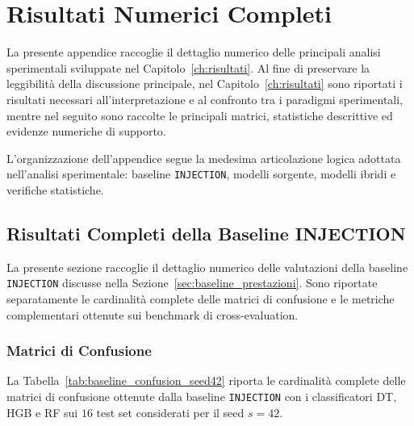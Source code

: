 \chapter{Risultati Numerici Completi}
\label{app:risultati_completi}

La presente appendice raccoglie il dettaglio numerico delle principali analisi sperimentali sviluppate nel Capitolo~\ref{ch:risultati}.
Al fine di preservare la leggibilità della discussione principale, nel Capitolo~\ref{ch:risultati} sono riportati i risultati necessari all'interpretazione e al confronto tra i paradigmi sperimentali, mentre nel seguito sono raccolte le principali matrici, statistiche descrittive ed evidenze numeriche di supporto.

L'organizzazione dell'appendice segue la medesima articolazione logica adottata nell'analisi sperimentale: baseline \texttt{INJECTION}, modelli sorgente, modelli ibridi e verifiche statistiche.



\section{Risultati Completi della Baseline INJECTION}
\label{app:baseline_injection}

La presente sezione raccoglie il dettaglio numerico delle valutazioni della baseline \texttt{INJECTION} discusse nella Sezione~\ref{sec:baseline_prestazioni}. 
Sono riportate separatamente le cardinalità complete delle matrici di confusione e le metriche complementari ottenute sui benchmark di cross-evaluation.

\subsection{Matrici di Confusione}

La Tabella~\ref{tab:baseline_confusion_seed42} riporta le cardinalità complete delle matrici di confusione ottenute dalla baseline \texttt{INJECTION} con i classificatori DT, HGB e RF sui $16$ test set considerati per il seed $s=42$.

